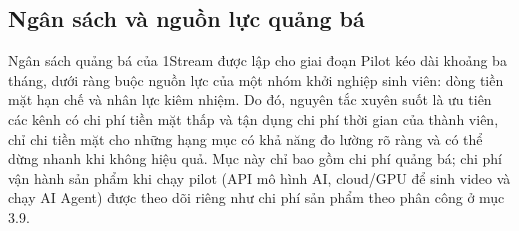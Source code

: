 %
%
%
%
%

\subsection{Ngân sách và nguồn lực quảng bá}


Ngân sách quảng bá của 1Stream được lập cho giai đoạn Pilot kéo dài khoảng ba tháng, dưới ràng buộc nguồn lực của một nhóm khởi nghiệp sinh viên: dòng tiền mặt hạn chế và nhân lực kiêm nhiệm. Do đó, nguyên tắc xuyên suốt là ưu tiên các kênh có chi phí tiền mặt thấp và tận dụng chi phí thời gian của thành viên, chỉ chi tiền mặt cho những hạng mục có khả năng đo lường rõ ràng và có thể dừng nhanh khi không hiệu quả. Mục này chỉ bao gồm chi phí quảng bá; chi phí vận hành sản phẩm khi chạy pilot (API mô hình AI, cloud/GPU để sinh video và chạy AI Agent) được theo dõi riêng như chi phí sản phẩm theo phân công ở mục 3.9.

